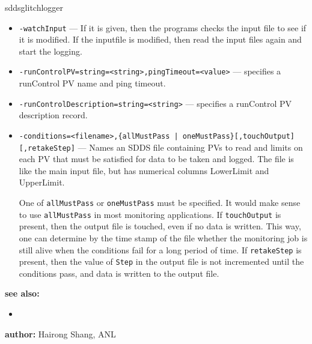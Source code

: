 \begin{sddsprog}{sddsglitchlogger}
\begin{itemize}
        \item {\tt -watchInput} --- If it is given, then the programs checks the input file to see if
                it is modified. If the inputfile is modified, then read the input files again and start
                the logging.
        \item {\tt -runControlPV=string=<string>,pingTimeout=<value>} --- specifies a runControl PV name
                and ping timeout.
        \item {\tt -runControlDescription=string=<string>} --- specifies a runControl PV description record.
        \item {\verb+-conditions=<filename>,{allMustPass | oneMustPass}[,touchOutput][,retakeStep]+} ---
                   Names an SDDS file containing PVs to read and limits on each PV that must
                   be satisfied for data to be taken and logged.  The file is like the main
                   input file, but has numerical columns LowerLimit and UpperLimit.

                One of \verb+allMustPass+ or \verb+oneMustPass+ must be specified. It would make sense
                to use \verb+allMustPass+ in most monitoring applications.
                If \verb+touchOutput+ is present, then the output file is touched, even if no data
                is written. This way, one can determine by the time stamp of the file
                whether the monitoring job is still alive
                when the conditions fail for a long period of time. If \verb+retakeStep+ is
                present, then the value of \verb+Step+ in the output file is not
                incremented until the conditions pass, and data is written to the output file.
    \end{itemize}

\item \textbf{see also:}
    \begin{itemize}
    \item {}
    \end{itemize}
\item \textbf{author:} Hairong Shang, ANL 
\end{sddsprog}
